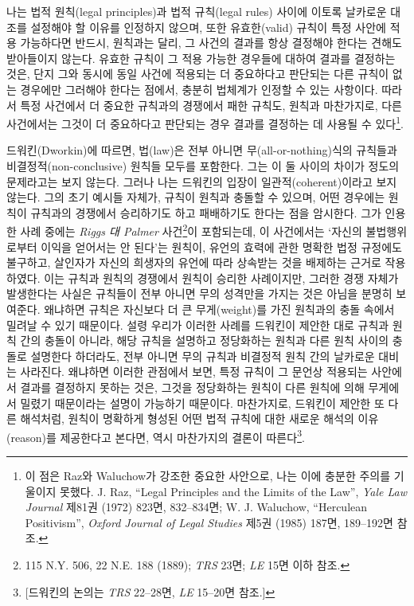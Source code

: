 나는 법적 원칙(legal principles)과 법적 규칙(legal rules) 사이에 이토록
날카로운 대조를 설정해야 할 이유를 인정하지 않으며, 또한 유효한(valid)
규칙이 특정 사안에 적용 가능하다면 반드시, 원칙과는 달리, 그 사건의
결과를 항상 결정해야 한다는 견해도 받아들이지 않는다. 유효한 규칙이 그
적용 가능한 경우들에 대하여 결과를 결정하는 것은, 단지 그와 동시에 동일
사건에 적용되는 더 중요하다고 판단되는 다른 규칙이 없는 경우에만
그러해야 한다는 점에서, 충분히 법체계가 인정할 수 있는 사항이다. 따라서
특정 사건에서 더 중요한 규칙과의 경쟁에서 패한 규칙도, 원칙과
마찬가지로, 다른 사건에서는 그것이 더 중요하다고 판단되는 경우 결과를
결정하는 데 사용될 수 있다\footnote{이 점은 Raz와 Waluchow가 강조한
  중요한 사안으로, 나는 이에 충분한 주의를 기울이지 못했다. J. Raz,
  ``Legal Principles and the Limits of the Law'', \emph{Yale Law
  Journal} 제81권 (1972) 823면, 832--834면; W. J. Waluchow, ``Herculean
  Positivism'', \emph{Oxford Journal of Legal Studies} 제5권 (1985)
  187면, 189--192면 참조.}.

드워킨(Dworkin)에 따르면, 법(law)은 전부 아니면 무(all-or-nothing)식의
규칙들과 비결정적(non-conclusive) 원칙들 모두를 포함한다. 그는 이 둘
사이의 차이가 정도의 문제라고는 보지 않는다. 그러나 나는 드워킨의 입장이
일관적(coherent)이라고 보지 않는다. 그의 초기 예시들 자체가, 규칙이
원칙과 충돌할 수 있으며, 어떤 경우에는 원칙이 규칙과의 경쟁에서
승리하기도 하고 패배하기도 한다는 점을 암시한다. 그가 인용한 사례 중에는
\emph{Riggs 대 Palmer} 사건\footnote{115 N.Y. 506, 22 N.E. 188 (1889);
  \emph{TRS} 23면; \emph{LE} 15면 이하 참조.}이 포함되는데, 이
사건에서는 `자신의 불법행위로부터 이익을 얻어서는 안 된다'는 원칙이,
유언의 효력에 관한 명확한 법정 규정에도 불구하고, 살인자가 자신의
희생자의 유언에 따라 상속받는 것을 배제하는 근거로 작용하였다. 이는
규칙과 원칙의 경쟁에서 원칙이 승리한 사례이지만, 그러한 경쟁 자체가
발생한다는 사실은 규칙들이 전부 아니면 무의 성격만을 가지는 것은 아님을
분명히 보여준다. 왜냐하면 규칙은 자신보다 더 큰 무게(weight)를 가진
원칙과의 충돌 속에서 밀려날 수 있기 때문이다. 설령 우리가 이러한 사례를
드워킨이 제안한 대로 규칙과 원칙 간의 충돌이 아니라, 해당 규칙을
설명하고 정당화하는 원칙과 다른 원칙 사이의 충돌로 설명한다 하더라도,
전부 아니면 무의 규칙과 비결정적 원칙 간의 날카로운 대비는 사라진다.
왜냐하면 이러한 관점에서 보면, 특정 규칙이 그 문언상 적용되는 사안에서
결과를 결정하지 못하는 것은, 그것을 정당화하는 원칙이 다른 원칙에 의해
무게에서 밀렸기 때문이라는 설명이 가능하기 때문이다. 마찬가지로,
드워킨이 제안한 또 다른 해석처럼, 원칙이 명확하게 형성된 어떤 법적
규칙에 대한 새로운 해석의 이유(reason)를 제공한다고 본다면, 역시
마찬가지의 결론이 따른다\footnote{{[}드워킨의 논의는 \emph{TRS}
  22--28면, \emph{LE} 15--20면 참조.{]}}.

